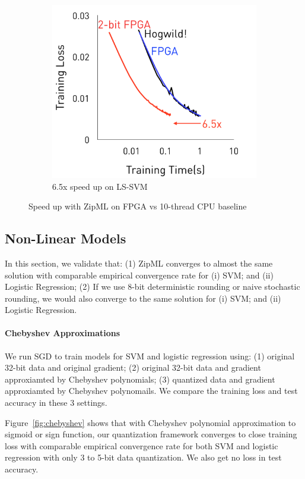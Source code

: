 \documentclass{article}
\begin{document}
\begin{figure}[h]
\begin{subfigure}[h]{.4\columnwidth}
    \includegraphics[width=\columnwidth]{final-experiments/SpeedUp-LSSVM} 
    \caption{6.5x speed up on LS-SVM}
    \end{subfigure}
\caption{Speed up with ZipML on FPGA vs 10-thread CPU baseline}
\label{fig:speedup}
\end{figure}
\subsection{Non-Linear Models}
In this section, we validate that: (1) ZipML 
converges to almost the same solution with comparable
empirical convergence rate for (i) SVM;
and (ii) Logistic Regression;
(2) If we use 8-bit deterministic rounding or naive stochastic rounding, we would also converge to the same solution for (i) SVM;
and (ii) Logistic Regression.

\paragraph{Chebyshev Approximations}
We run SGD to train models for SVM and logistic regression using:
(1) original 32-bit data and original gradient; (2) original 32-bit data and gradient approxiamted by Chebyshev polynomials;
(3) quantized data and gradient approxiamted by Chebyshev polynomails.
We compare the training loss and test accuracy in these 3 settings.

Figure~\ref{fig:chebyshev} shows that with Chebyshev polynomial approximation to sigmoid 
or sign function, our quantization framework
converges to close training loss with comparable
empirical convergence rate for both SVM and logistic regression
with only 3 to 5-bit data quantization. We also get no loss in test accuracy.
\end{document}
